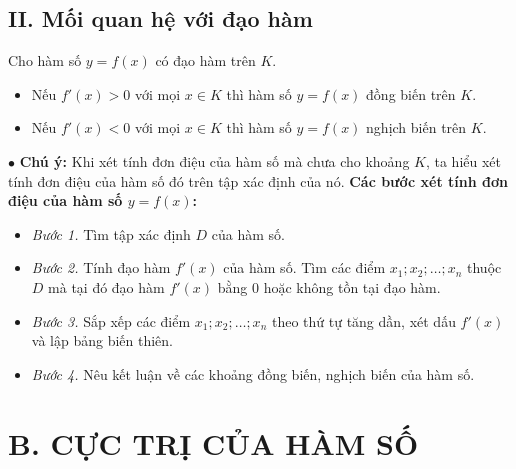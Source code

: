 \documentclass[12pt,a4paper]{extarticle}
\begin{document}
\subsection*{II. Mối quan hệ với đạo hàm}
\begin{tcolorbox}[
		colback=orange!5!white,
		colframe=orange!50!black,
		arc=3mm,
		outer arc=3mm,
		boxrule=1pt,
		enhanced
	]
	Cho hàm số $y = f(x)$ có đạo hàm trên $K$.
	\begin{itemize}
		\item Nếu $f'(x) > 0$ với mọi $x \in K$ thì hàm số $y = f(x)$ đồng biến trên $K$.
		\item Nếu $f'(x) < 0$ với mọi $x \in K$ thì hàm số $y = f(x)$ nghịch biến trên $K$.
	\end{itemize}
\end{tcolorbox}
\vspace{0.5cm}
\noindent $\bullet$ \textbf{Chú ý:} Khi xét tính đơn điệu của hàm số mà chưa cho khoảng $K$, ta hiểu xét tính đơn điệu của hàm số đó trên tập xác định của nó.
\noindent \textbf{Các bước xét tính đơn điệu của hàm số $y = f(x)$:}
\begin{itemize}
	\item \textit{Bước 1.} Tìm tập xác định $D$ của hàm số.
	\item \textit{Bước 2.} Tính đạo hàm $f'(x)$ của hàm số. Tìm các điểm $x_1; x_2; \dots; x_n$ thuộc $D$ mà tại đó đạo hàm $f'(x)$ bằng $0$ hoặc không tồn tại đạo hàm.
	\item \textit{Bước 3.} Sắp xếp các điểm $x_1; x_2; \dots; x_n$ theo thứ tự tăng dần, xét dấu $f'(x)$ và lập bảng biến thiên.
	\item \textit{Bước 4.} Nêu kết luận về các khoảng đồng biến, nghịch biến của hàm số.
\end{itemize}



\section*{B. CỰC TRỊ CỦA HÀM SỐ}
\end{document}

